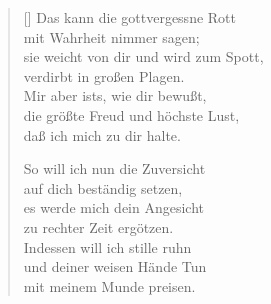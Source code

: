 \begin{multicols}{2}
\begin{verse}[\versewidth]
 Das kann die gottvergessne Rott\\
mit Wahrheit nimmer sagen;\\
sie weicht von dir und wird zum Spott,\\
verdirbt in großen Plagen.\\
Mir aber ists, wie dir bewußt,\\
die größte Freud und höchste Lust,\\
daß ich mich zu dir halte.

 So will ich nun die Zuversicht\\
auf dich beständig setzen,\\
es werde mich dein Angesicht\\
zu rechter Zeit ergötzen.\\
Indessen will ich stille ruhn\\
und deiner weisen Hände Tun\\
mit meinem Munde preisen.
   
\end{verse}
\end{multicols}
